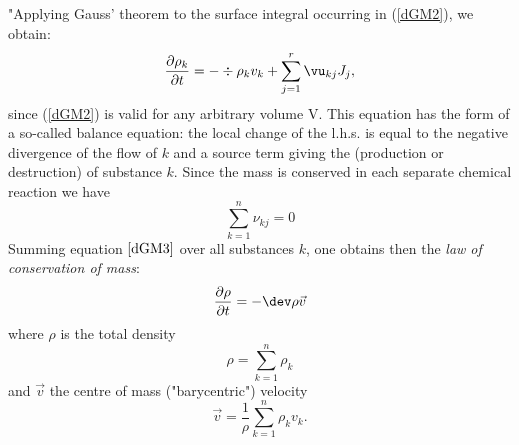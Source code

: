 "Applying Gauss' theorem to the surface integral occurring in (\ref{dGM2}), we obtain:
\begin{equation}
\frac{\partial \rho_k}{\partial t} = - \div \rho_k v_k + \sum_{j=1}^r \vu_{kj} J_j,
\label{dGM3}
\end{equation}
since (\ref{dGM2}) is valid for any arbitrary volume V. This equation has the form of a so-called balance equation: the local change of the l.h.s. is equal to the negative divergence of the flow of $k$ and a source term giving the (production or destruction) of substance $k$.
Since the mass is conserved in each separate chemical reaction we have
\begin{equation}
\sum_{k=1}^n \nu_{kj}= 0 
\end{equation}
Summing equation $\ref{dGM3}$ over all substances $k$, one obtains then the {\it law of conservation of mass}:
\begin{equation}
\frac{\partial \rho}{\partial t} = - \dev \rho \vec{v}
\label{dGM5}
\end{equation}
where $\rho$ is the total density
\begin{equation}
\rho = \sum_{k=1}^n \rho_k
\end{equation}
and $\vec{v}$ the centre of mass ("barycentric") velocity
\begin{equation}
\vec{v} = \frac{1}{\rho} \sum_{k=1}^n \rho_k v_k.
\end{equation}
